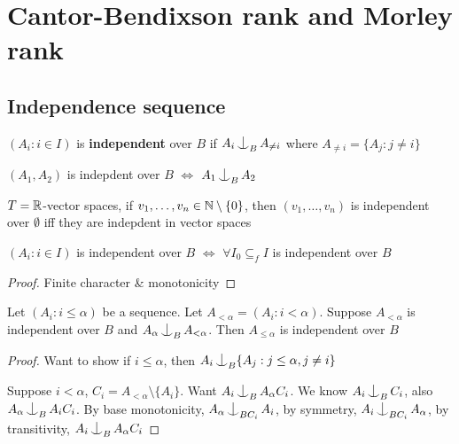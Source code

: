 \documentclass[11pt]{article}
\begin{document}
\section{Cantor-Bendixson rank and Morley rank}
\label{sec:org89f7d84}
\subsection{Independence sequence}
\label{sec:orgb0eb2f8}
\begin{definition}[]
\((A_i:i\in I)\) is \textbf{independent} over \(B\) if \(A_i\ind_BA_{\neq i}\) where \(A_{\neq i}=\{A_j:j\neq i\}\)
\end{definition}

\begin{examplle}[]
\((A_1,A_2)\) is indepdent over \(B\) \(\Leftrightarrow\) \(A_1\ind_BA_2\)
\end{examplle}

\begin{fact}[]
\(T=\mathbb{R}\)-vector spaces, if \(v_1,\dots,v_n\in\mathbb{N}\setminus\{0\}\), then \((v_1,\dots,v_n)\) is independent over \(\emptyset\)
iff they are indepdent in vector spaces
\end{fact}

\begin{proposition}[]
\((A_i:i\in I)\) is independent over \(B\) \(\Leftrightarrow\) \(\forall I_0\subseteq_fI\) is independent over \(B\)
\end{proposition}

\begin{proof}
Finite character \& monotonicity
\end{proof}

\begin{lemma}[]
\label{5.5.5}
Let \((A_i:i\le\alpha)\) be a sequence. Let \(A_{<\alpha}=(A_i:i<\alpha)\). Suppose \(A_{<\alpha}\) is independent
over \(B\) and \(A_\alpha\ind_BA_{<\alpha}\). Then \(A_{\le\alpha}\) is independent over \(B\)
\end{lemma}

\begin{proof}
Want to show if \(i\le\alpha\), then \(A_i\ind_B\{A_j:j\le\alpha,j\neq i\}\)

Suppose \(i<\alpha\), \(C_i=A_{<\alpha}\setminus\{A_i\}\). Want \(A_i\ind_BA_\alpha C_i\). We know \(A_i\ind_BC_i\),
also \(A_\alpha\ind_BA_iC_i\). By base monotonicity, \(A_\alpha\ind_{BC_i}A_i\), by
symmetry, \(A_i\ind_{BC_i}A_\alpha\), by transitivity, \(A_i\ind_{B}A_\alpha C_i\)
\end{proof}
\end{document}
